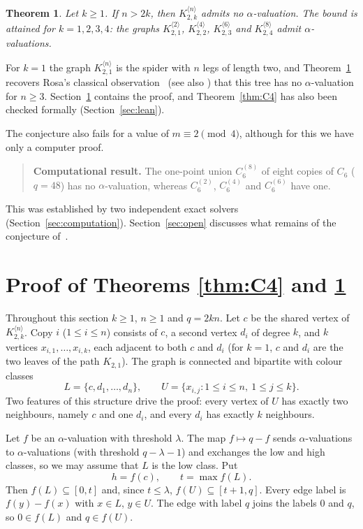 \documentclass[11pt]{amsart}
\newtheorem{theorem}{Theorem}
\theoremstyle{definition}
\theoremstyle{remark}
\begin{document}
\begin{theorem}\label{thm:K2k}
Let $k \ge 1$. If $n > 2k$, then $K_{2,k}^{\langle n\rangle}$ admits no $\alpha$-valuation. The bound is attained for $k = 1, 2, 3, 4$: the graphs $K_{2,1}^{\langle 2\rangle}$, $K_{2,2}^{\langle 4\rangle}$, $K_{2,3}^{\langle 6\rangle}$ and $K_{2,4}^{\langle 8\rangle}$ admit $\alpha$-valuations.
\end{theorem}

For $k = 1$ the graph $K_{2,1}^{\langle n\rangle}$ is the spider with $n$ legs of length two, and Theorem~\ref{thm:K2k} recovers Rosa's classical observation~\cite{Rosa} (see also \cite{ShiueLu}) that this tree has no $\alpha$-valuation for $n \ge 3$. Section~\ref{sec:proof} contains the proof, and Theorem~\ref{thm:C4} has also been checked formally (Section~\ref{sec:lean}).

The conjecture also fails for a value of $m \equiv 2 \pmod 4$, although for this we have only a computer proof.

\begin{quote}
\textbf{Computational result.} The one-point union $C_6^{(8)}$ of eight copies of $C_6$ ($q = 48$) has no $\alpha$-valuation, whereas $C_6^{(2)}$, $C_6^{(4)}$ and $C_6^{(6)}$ have one.
\end{quote}

This was established by two independent exact solvers (Section~\ref{sec:computation}). Section~\ref{sec:open} discusses what remains of the conjecture of~\cite{FIM}.

\section{Proof of Theorems \ref{thm:C4} and \ref{thm:K2k}}\label{sec:proof}

Throughout this section $k \ge 1$, $n \ge 1$ and $q = 2kn$. Let $c$ be the shared vertex of $K_{2,k}^{\langle n\rangle}$. Copy $i$ ($1 \le i \le n$) consists of $c$, a second vertex $d_i$ of degree $k$, and $k$ vertices $x_{i,1},\dots,x_{i,k}$, each adjacent to both $c$ and $d_i$ (for $k = 1$, $c$ and $d_i$ are the two leaves of the path $K_{2,1}$). The graph is connected and bipartite with colour classes
\[
  L = \{c, d_1, \dots, d_n\}, \qquad U = \{x_{i,j} : 1 \le i \le n,\ 1 \le j \le k\}.
\]
Two features of this structure drive the proof: every vertex of $U$ has exactly two neighbours, namely $c$ and one $d_i$, and every $d_i$ has exactly $k$ neighbours.

Let $f$ be an $\alpha$-valuation with threshold $\lambda$. The map $f \mapsto q - f$ sends $\alpha$-valuations to $\alpha$-valuations (with threshold $q-\lambda-1$) and exchanges the low and high classes, so we may assume that $L$ is the low class. Put
\[
  h = f(c), \qquad t = \max f(L).
\]
Then $f(L) \subseteq [0,t]$ and, since $t \le \lambda$, $f(U) \subseteq [t+1, q]$. Every edge label is $f(y) - f(x)$ with $x \in L$, $y \in U$. The edge with label $q$ joins the labels $0$ and $q$, so $0 \in f(L)$ and $q \in f(U)$.
\end{document}
